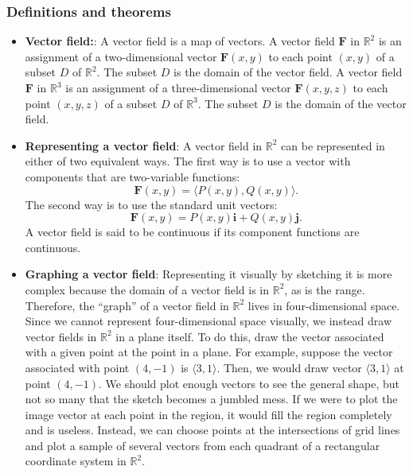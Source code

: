 \documentclass{report}
\begin{document}
    \subsubsection{Definitions and theorems}
    \begin{itemize}
        \item \textbf{Vector field:}:  A vector field is a map of vectors.
            \bigbreak \noindent 
            A vector field $\mathbf{F}$ in $\mathbb{R}^2$ is an assignment of a two-dimensional vector $\mathbf{F}(x,y)$ to each point $(x,y)$ of a subset $D$ of $\mathbb{R}^2$. The subset $D$ is the domain of the vector field.
            \bigbreak \noindent 
            A vector field $\mathbf{F}$ in $\mathbb{R}^3$ is an assignment of a three-dimensional vector $\mathbf{F}(x,y,z)$ to each point $(x,y,z)$ of a subset $D$ of $\mathbb{R}^3$. The subset $D$ is the domain of the vector field.
        \item \textbf{Representing a vector field}:
            A vector field in $\mathbb{R}^2$ can be represented in either of two equivalent ways. The first way is to use a vector with components that are two-variable functions:
            \[
                \mathbf{F}(x,y) = \langle P(x,y), Q(x,y) \rangle.
            \]
            The second way is to use the standard unit vectors:
            \[
                \mathbf{F}(x,y) = P(x,y)\mathbf{i} + Q(x,y)\mathbf{j}.
            \]
            A vector field is said to be continuous if its component functions are continuous.
        \item \textbf{Graphing a vector field}:
            Representing it visually by sketching it is more complex because the domain of a vector field is in $\mathbb{R}^2$, as is the range. Therefore, the “graph” of a vector field in $\mathbb{R}^2$ lives in four-dimensional space. Since we cannot represent four-dimensional space visually, we instead draw vector fields in $\mathbb{R}^2$ in a plane itself. To do this, draw the vector associated with a given point at the point in a plane. For example, suppose the vector associated with point $(4,-1)$ is $\langle 3,1 \rangle$. Then, we would draw vector $\langle 3,1 \rangle$ at point $(4,-1)$.
            \bigbreak \noindent 
            We should plot enough vectors to see the general shape, but not so many that the sketch becomes a jumbled mess. If we were to plot the image vector at each point in the region, it would fill the region completely and is useless. Instead, we can choose points at the intersections of grid lines and plot a sample of several vectors from each quadrant of a rectangular coordinate system in $\mathbb{R}^2$.

\end{itemize}
\end{document}
